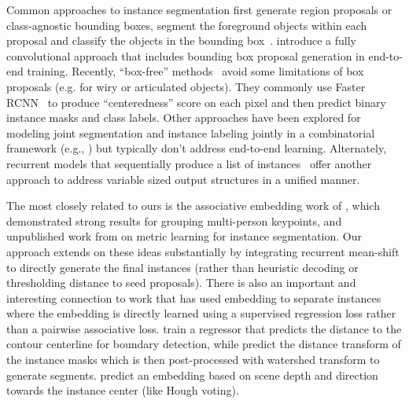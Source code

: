 \documentclass[10pt,twocolumn,letterpaper]{article}
\begin{document}
Common approaches to instance segmentation first generate region proposals or
class-agnostic bounding boxes, segment the foreground objects within each
proposal and classify the objects in the bounding box~\cite{yang2012layered,
ladicky2010and, hariharan2014simultaneous, chen2015multi, dai2016instance,
liang2016reversible, he2017mask}.  \cite{li2016fully} introduce a fully
convolutional approach that includes bounding box proposal generation in
end-to-end training.  Recently, ``box-free''
methods~\cite{pinheiro2015learning, pinheiro2016learning, liang2015proposal,
hu2016fastmask} avoid some limitations of box proposals (e.g. for wiry or
articulated objects). They commonly use Faster RCNN~\cite{ren2015faster} to
produce ``centeredness'' score on each pixel and then predict binary instance
masks and class labels.  Other approaches have been explored for modeling joint
segmentation and instance labeling jointly in a combinatorial framework (e.g.,
\cite{kirillov2016instancecut}) but typically don't address end-to-end
learning.  Alternately, recurrent models that sequentially produce a list of
instances~\cite{romera2016recurrent,renend} offer another approach to address
variable sized output structures in a unified manner.

The most closely related to ours is the associative embedding work of
\cite{newell2016associative}, which demonstrated strong results for grouping
multi-person keypoints, and unpublished work from \cite{fathi2017semantic} on
metric learning for instance segmentation.  Our approach extends on these ideas
substantially by integrating recurrent mean-shift to directly generate the
final instances (rather than heuristic decoding or thresholding distance to
seed proposals). There is also an important and interesting connection to work
that has used embedding to separate instances where the embedding is directly
learned using a supervised regression loss rather than a pairwise associative
loss.  \cite{sironi2014multiscale} train a regressor that predicts the distance
to the contour centerline for boundary detection, while \cite{bai2016deep}
predict the distance transform of the instance masks which is then
post-processed with watershed transform to generate segments.
\cite{uhrig2016pixel} predict an embedding based on scene depth and direction
towards the instance center (like Hough voting).
\end{document}
